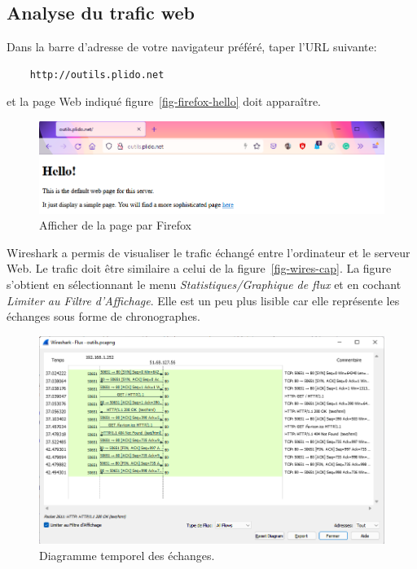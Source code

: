\subsection{Analyse du trafic web}

Dans la barre d'adresse de votre navigateur préféré, taper l'URL suivante:

\begin{verbatim}
    http://outils.plido.net
\end{verbatim}

\noindent et la page Web indiqué figure~\vref{fig-firefox-hello} doit apparaître. 

\begin{figure}[tbp]
\centerline{\includegraphics[width=1\columnwidth]{Pictures/firefox-simple.png}}
\caption{Afficher de la page par Firefox}
\label{fig-firefox-hello}
\end{figure}

  \vspace{1em}

Wireshark a permis de visualiser le trafic échangé entre l'ordinateur et le serveur Web. Le trafic doit être similaire a celui de la figure~\vref{fig-wires-cap}. La figure s'obtient en sélectionnant le menu \textit{Statistiques/Graphique de flux} et en cochant \textit{Limiter au Filtre d'Affichage}. Elle est un peu plus lisible car elle représente les échanges sous forme de chronographes.

\begin{figure}[tbp]
\centerline{\includegraphics[width=1\columnwidth]{Pictures/ws-filtre.png}}
\caption{Diagramme temporel des échanges.}
\label{fig-ws-filtre}
\end{figure}

